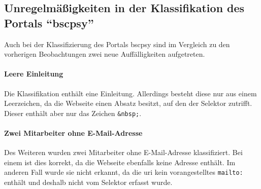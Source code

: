 \subsection{Unregelmäßigkeiten in der Klassifikation des Portals "`\acrshort{bscpsy}"'}
    Auch bei der Klassifizierung des Portals \gls{bscpsy}
    sind im Vergleich zu den vorherigen Beobachtungen zwei neue
    Auffälligkeiten aufgetreten.

    \paragraph{Leere Einleitung}
        Die Klassifikation enthält eine Einleitung.
        Allerdings besteht diese nur aus einem Leerzeichen,
        da die Webseite einen Absatz besitzt,
        auf den der Selektor zutrifft.
        Dieser enthält aber nur das Zeichen \texttt{\&nbsp;}.

    \paragraph{Zwei Mitarbeiter ohne E-Mail-Adresse}
        Des Weiteren wurden zwei Mitarbeiter ohne E-Mail-Adresse klassifiziert.
        Bei einem ist dies korrekt, da die Webseite ebenfalls keine Adresse enthält.
        Im anderen Fall wurde sie nicht erkannt,
        da die \gls{uri} kein vorangestelltes \texttt{mailto:} enthält
        und deshalb nicht vom Selektor erfasst wurde.
        